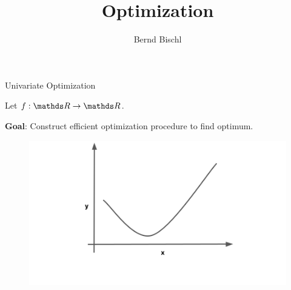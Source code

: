 \documentclass[11pt,compress,t,notes=noshow, xcolor=table]{beamer}
\title{Optimization}
\author{Bernd Bischl}
\date{}
\begin{document}
\sloppy

\begin{vbframe}{Univariate Optimization}

Let $f: \R \to \R$. 

\lz 

\textbf{Goal}: Construct efficient optimization procedure to find optimum. 

\vspace*{0.2cm} 

\begin{figure}
  \includegraphics{figure_man/golden-ratio-0.png}
\end{figure}

\end{vbframe}
\end{document}

